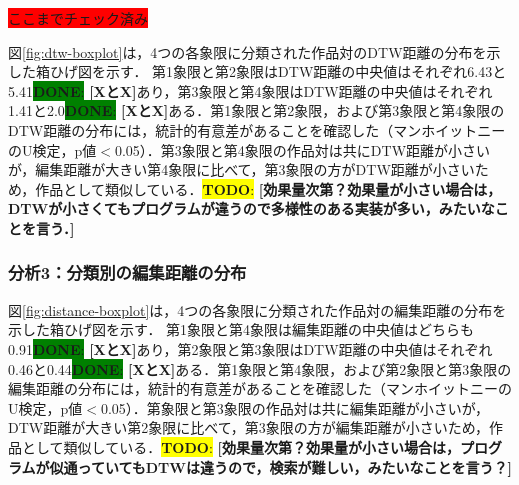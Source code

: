 \documentclass[T,J]{fose} %
\newcommand{\todo}[1]{\colorbox{yellow}{{\bf TODO}:}{\color{red} {\textbf{[#1]}}}}
\newcommand{\done}[2]{\colorbox{green}{{\bf DONE}:} {\textbf{[#1]}}}
\newcommand{\checked}[3]{\colorbox{red}{ここまでチェック済み}}
\begin{document}
\checked{}

\subsubsection{分析2：分類別のDTW距離の分布}

図\ref{fig:dtw-boxplot}は，4つの各象限に分類された作品対のDTW距離の分布を示した箱ひげ図を示す．
第1象限と第2象限はDTW距離の中央値はそれぞれ6.43と5.41\done{XとX}であり，第3象限と第4象限はDTW距離の中央値はそれぞれ1.41と2.0\done{XとX}である．第1象限と第2象限，および第3象限と第4象限のDTW距離の分布には，統計的有意差があることを確認した（マンホイットニーのU検定，p値$<$0.05）．第3象限と第4象限の作品対は共にDTW距離が小さいが，編集距離が大きい第4象限に比べて，第3象限の方がDTW距離が小さいため，作品として類似している．\todo{効果量次第？効果量が小さい場合は，DTWが小さくてもプログラムが違うので多様性のある実装が多い，みたいなことを言う．}

\subsubsection{分析3：分類別の編集距離の分布}
図\ref{fig:distance-boxplot}は，4つの各象限に分類された作品対の編集距離の分布を示した箱ひげ図を示す．
第1象限と第4象限は編集距離の中央値はどちらも0.91\done{XとX}であり，第2象限と第3象限はDTW距離の中央値はそれぞれ0.46と0.44\done{XとX}である．第1象限と第4象限，および第2象限と第3象限の編集距離の分布には，統計的有意差があることを確認した（マンホイットニーのU検定，p値$<$0.05）．第象限と第3象限の作品対は共に編集距離が小さいが，DTW距離が大きい第2象限に比べて，第3象限の方が編集距離が小さいため，作品として類似している．\todo{効果量次第？効果量が小さい場合は，プログラムが似通っていてもDTWは違うので，検索が難しい，みたいなことを言う？}
\end{document}
